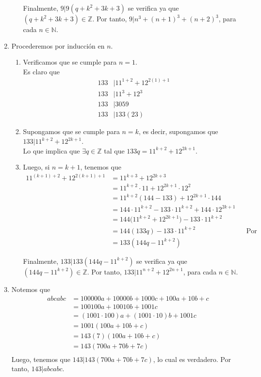 \documentclass[11pt]{article}
\newcommand{\N}{\mathbb{N}}
\newcommand{\Z}{\mathbb{Z}}
\begin{document}
\begin{enumerate}[label=4.\arabic*]
\begin{enumerate}[label=\roman*)]
      Finalmente, $9|9(q+k^2+3k+3)$ se verifica ya que $(q+k^2+3k+3)\in \Z$. Por tanto, $9|n^3+(n+1)^3+(n+2)^3$, para cada $n \in \N$.
    \end{enumerate}
    \item Procederemos por inducción en $n$.
      \begin{enumerate}[label=\roman*)]
        \item Verificamos que se cumple para $n=1$. \\ Es claro que
        \begin{align*}
          133 &|11^{1+2}+12^{2(1)+1} \\
          133 &|11^{3}+12^{3} \\
          133 &|3059 \\
          133 &| 133(23)
        \end{align*}
      \item Supongamos que se cumple para $n=k$, es decir, supongamos que $133|11^{k+2}+12^{2k+1}$. \\ Lo que implica que $\exists q \in \Z$ tal que $133q=11^{k+2}+12^{2k+1}$.
      \item Luego, si $n=k+1$, tenemos que
        \begin{align*}
          11^{(k+1)+2}+12^{2(k+1)+1} &= 11^{k+3}+12^{2k+3} \\
          &= 11^{k+2} \cdot 11 + 12^{2k+1} \cdot 12^2 \\
          &= 11^{k+2} (144-133) + 12^{2k+1} \cdot 144 \\
          &= 144 \cdot 11^{k+2} - 133 \cdot 11^{k+2} + 144 \cdot 12^{2k+1} \\
          &= 144 \big( 11^{k+2} + 12^{2k+1} \big) - 133 \cdot 11^{k+2} \\
          &= 144 (133q) - 133 \cdot 11^{k+2} && \text{Por hipótesis de inducción}\\
          &= 133 (144q-11^{k+2})
        \end{align*}

        Finalmente, $133|133(144q-11^{k+2})$ se verifica ya que $(144q-11^{k+2})\in \Z$. Por tanto, $133|11^{n+2}+12^{2n+1}$, para cada $n\in \N$.
        \end{enumerate}
      \item Notemos que
      \begin{align*}
      abcabc &= 100000a+10000b+1000c+100a+10b+c \\
        &= 100100a+10010b+1001c\\
        &= (1001 \cdot 100)a + (1001 \cdot 10)b + 1001c \\
        &= 1001(100a+10b+c) \\
        &= 143(7)(100a+10b+c)\\
        &= 143(700a+70b+7c)\\
      \end{align*}
      Luego, tenemos que $143|143(700a+70b+7c)$, lo cual es verdadero. Por tanto, $143|abcabc$.
\end{enumerate}
\end{document}
